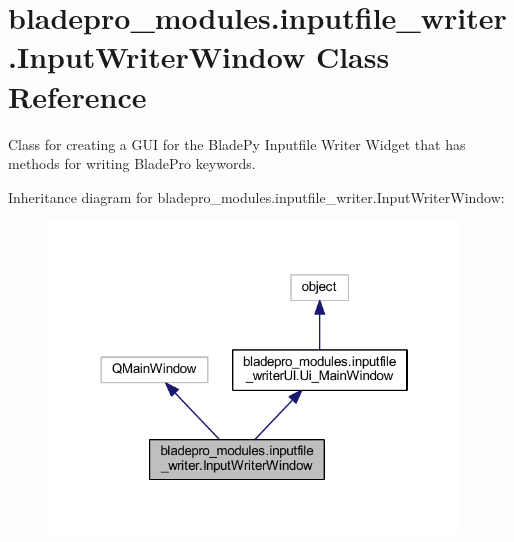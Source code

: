 \hypertarget{a00071}{}\section{bladepro\+\_\+modules.\+inputfile\+\_\+writer.\+Input\+Writer\+Window Class Reference}
\label{a00071}


Class for creating a G\+UI for the Blade\+Py Inputfile Writer Widget that has methods for writing Blade\+Pro keywords.  




Inheritance diagram for bladepro\+\_\+modules.\+inputfile\+\_\+writer.\+Input\+Writer\+Window\+:
\nopagebreak
\begin{figure}[H]
\begin{center}
\leavevmode
\includegraphics[width=310pt]{a00070}
\end{center}
\end{figure}
